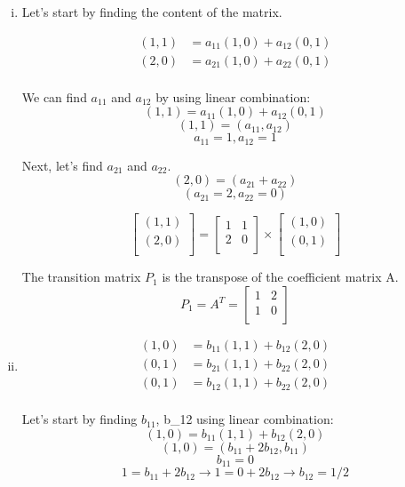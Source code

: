 \documentclass{book}
\begin{document}
\begin{enumerate}[i.]
	\item Let's start by finding the content of the matrix.

		\begin{align*}
			(1, 1) &= a_{11}(1, 0) + a_{12}(0, 1) \\
			(2, 0) &= a_{21}(1, 0) + a_{22}(0, 1) \\
	\end{align*}

		We can find \(a_{11}\) and \(a_{12}\) by using linear combination:
		\[(1, 1) = a_{11}(1, 0) + a_{12}(0, 1)\]
		\[(1, 1) = (a_{11}, a_{12})\]
		\[a_{11} = 1, a_{12} = 1\]

		Next, let's find \(a_{21}\) and \(a_{22}\).
		\[(2, 0) = (a_{21} + a_{22})\]
		\[(a_{21} = 2, a_{22} = 0)\]

		\[\begin{bmatrix}
			(1, 1) \\
			(2, 0) \\
		\end{bmatrix}
		=
		\begin{bmatrix}
			1 & 1 \\
			2 & 0 \\
		\end{bmatrix}
		\times
		\begin{bmatrix}
			(1, 0) \\
			(0, 1) \\
		\end{bmatrix}\]

		The transition matrix \(P_1\) is the transpose of the coefficient matrix A.
		\[P_1 = A^T = \begin{bmatrix}
			1 & 2 \\
			1 & 0 \\
		\end{bmatrix}\]
		
	\item \begin{align*}
			(1, 0) &= b_{11}(1, 1) + b_{12} (2, 0) \\
			(0, 1) &= b_{21}(1, 1) + b_{22}(2, 0) \\
			(0, 1) &= b_{12}(1, 1) + b_{22}(2, 0) \\
	\end{align*}

		Let's start by finding \(b_{11}\), b_{12} using linear combination:
		\[(1, 0) = b_{11}(1, 1) + b_{12} (2, 0)\]
		\[(1, 0) = (b_{11} + 2b_{12}, b_{11})\]
		\[b_{11} = 0\]
		\[1 = b_{11} + 2b_{12} \rightarrow 1 = 0 + 2b_{12} \rightarrow b_{12} = 1/2\]


\end{enumerate}
\end{document}
